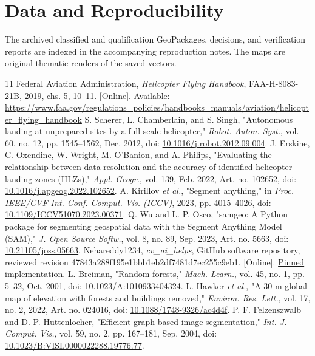 \documentclass[journal]{IEEEtran}
\begin{document}
\section*{Data and Reproducibility}
The archived classified and qualification GeoPackages, decisions, and verification reports are indexed in the accompanying reproduction notes. The maps are original thematic renders of the saved vectors.
\begin{thebibliography}{11}
Federal Aviation Administration, \emph{Helicopter Flying Handbook}, FAA-H-8083-21B, 2019, chs. 5, 10--11. [Online]. Available: \url{https://www.faa.gov/regulations_policies/handbooks_manuals/aviation/helicopter_flying_handbook}
S. Scherer, L. Chamberlain, and S. Singh, "Autonomous landing at unprepared sites by a full-scale helicopter," \emph{Robot. Auton. Syst.}, vol. 60, no. 12, pp. 1545--1562, Dec. 2012, doi: \href{https://doi.org/10.1016/j.robot.2012.09.004}{10.1016/j.robot.2012.09.004}.
J. Erskine, C. Oxendine, W. Wright, M. O'Banion, and A. Philips, "Evaluating the relationship between data resolution and the accuracy of identified helicopter landing zones (HLZs)," \emph{Appl. Geogr.}, vol. 139, Feb. 2022, Art. no. 102652, doi: \href{https://doi.org/10.1016/j.apgeog.2022.102652}{10.1016/j.apgeog.2022.102652}.
A. Kirillov \emph{et al.}, "Segment anything," in \emph{Proc. IEEE/CVF Int. Conf. Comput. Vis. (ICCV)}, 2023, pp. 4015--4026, doi: \href{https://doi.org/10.1109/ICCV51070.2023.00371}{10.1109/ICCV51070.2023.00371}.
Q. Wu and L. P. Osco, "samgeo: A Python package for segmenting geospatial data with the Segment Anything Model (SAM)," \emph{J. Open Source Softw.}, vol. 8, no. 89, Sep. 2023, Art. no. 5663, doi: \href{https://doi.org/10.21105/joss.05663}{10.21105/joss.05663}.
Nehareddy1234, \emph{cv\_ai\_helps}, GitHub software repository, reviewed revision 47843a288f195e1bbb1eb2df7481d7ec255c9eb1. [Online]. \href{https://github.com/Nehareddy1234/cv_ai_helps/tree/47843a288f195e1bbb1eb2df7481d7ec255c9eb1}{Pinned implementation}.
L. Breiman, "Random forests," \emph{Mach. Learn.}, vol. 45, no. 1, pp. 5--32, Oct. 2001, doi: \href{https://doi.org/10.1023/A:1010933404324}{10.1023/A:1010933404324}.
L. Hawker \emph{et al.}, "A 30 m global map of elevation with forests and buildings removed," \emph{Environ. Res. Lett.}, vol. 17, no. 2, 2022, Art. no. 024016, doi: \href{https://doi.org/10.1088/1748-9326/ac4d4f}{10.1088/1748-9326/ac4d4f}.
P. F. Felzenszwalb and D. P. Huttenlocher, "Efficient graph-based image segmentation," \emph{Int. J. Comput. Vis.}, vol. 59, no. 2, pp. 167--181, Sep. 2004, doi: \href{https://doi.org/10.1023/B:VISI.0000022288.19776.77}{10.1023/B:VISI.0000022288.19776.77}.

\end{thebibliography}
\end{document}
